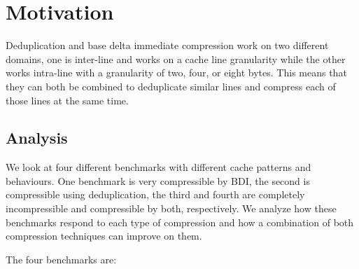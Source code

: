 
\chapter{Motivation}
\label{ch:Motivation}
Deduplication and base delta immediate compression work on two different domains, one is inter-line and works on a cache line granularity while the other works intra-line with a granularity of two, four, or eight bytes. This means that they can both be combined to deduplicate similar lines and compress each of those lines at the same time.

\section{Analysis}
\label{Analysis}
We look at four different benchmarks with different cache patterns and behaviours. One benchmark is very compressible by BDI, the second is compressible using deduplication, the third and fourth are completely incompressible and compressible by both, respectively. We analyze how these benchmarks respond to each type of compression and how a combination of both compression techniques can improve on them.\par
The four benchmarks are:
